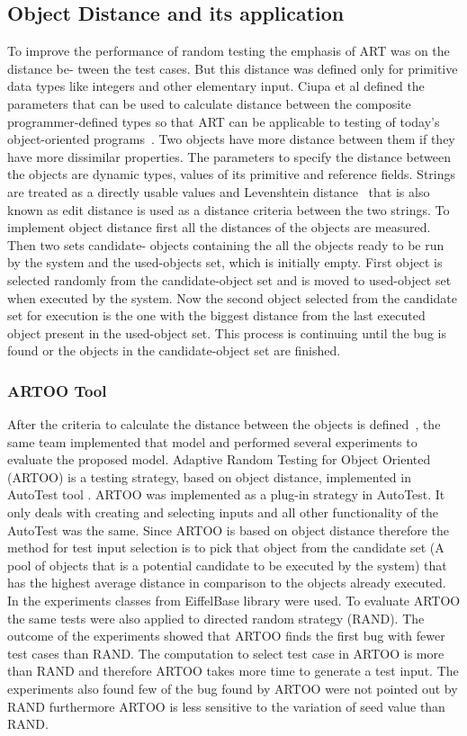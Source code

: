 \subsection{Object Distance and its application}
To improve the performance of random testing the emphasis of ART was on the distance be- tween the test cases. But this distance was defined only for primitive data types like integers and other elementary input. Ciupa et al defined the parameters that can be used to calculate distance between the composite programmer-defined types so that ART can be applicable to testing of today’s object-oriented programs~\cite{Ciupa2006}. Two objects have more distance between them if they have more dissimilar properties. The parameters to specify the distance between the objects are dynamic types, values of its primitive and reference fields. Strings are treated as a directly usable values and Levenshtein distance~\cite{Levenshtein1966} that is also known as edit distance is used as a distance criteria between the two strings. To implement object distance first all the distances of the objects are measured. Then two sets candidate- objects containing the all the objects ready to be run by the system and the used-objects set, which is initially empty. First object is selected randomly from the candidate-object set and is moved to used-object set when executed by the system. Now the second object selected from the candidate set for execution is the one with the biggest distance from the last executed object present in the used-object set. This process is continuing until the bug is found or the objects in the candidate-object set are finished.

\subsubsection{ARTOO Tool}
After the criteria to calculate the distance between the objects is defined~\cite{Ciupa2006}, the same team implemented that model and performed several experiments to evaluate the proposed model. Adaptive Random Testing for Object Oriented (ARTOO) is a testing strategy, based on object distance, implemented in AutoTest tool \cite{16 search it Mendeley}.
ARTOO was implemented as a plug-in strategy in AutoTest. It only deals with creating and selecting inputs and all other functionality of the AutoTest was the same. Since ARTOO is based on object distance therefore the method for test input selection is to pick that object from the candidate set (A pool of objects that is a potential candidate to be executed by the system) that has the highest average distance in comparison to the objects already executed. In the experiments classes from EiffelBase library \cite{17 search it mendeley} were used. To evaluate ARTOO the same tests were also applied to directed random strategy (RAND). The outcome of the experiments showed that ARTOO finds the first bug with fewer test cases than RAND. The computation to select test case in ARTOO is more than RAND and therefore ARTOO takes more time to generate a test input. The experiments also found few of the bug found by ARTOO were not pointed out by RAND furthermore ARTOO is less sensitive to the variation of seed value than RAND.

